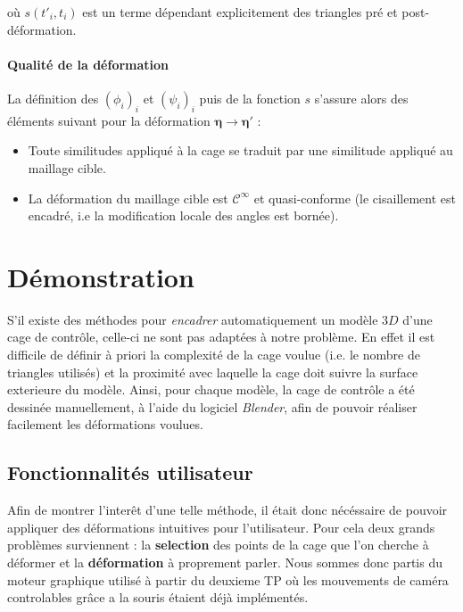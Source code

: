 \documentclass[10pt,a4paper]{article}
\begin{document}
où $s \left(t'_i, t_i \right)$ est un terme dépendant explicitement des triangles pré et post-déformation.

\paragraph{Qualité de la déformation}La définition des $\left( \phi_i \right)_i$ et $\left( \psi_i \right)_i$ puis de la fonction $s$ s'assure alors des éléments suivant pour la déformation $\boldsymbol\eta \rightarrow \boldsymbol\eta'$ :
\begin{itemize}
\item Toute similitudes appliqué à la cage se traduit par une similitude appliqué au maillage cible.
\item La déformation du maillage cible est $\mathcal{C}^\infty$ et quasi-conforme (le cisaillement est encadré, i.e la modification locale des angles est bornée).
\end{itemize}

\section{Démonstration}
S'il existe des méthodes pour \textit{encadrer} automatiquement un modèle $3D$ d'une cage de contrôle, celle-ci ne sont pas adaptées à notre problème. En effet il est difficile de définir à  priori la complexité de la cage voulue (i.e. le nombre de triangles utilisés) et la proximité avec laquelle la cage doit suivre la surface exterieure du modèle. Ainsi, pour chaque modèle, la cage de contrôle a été dessinée manuellement, à l'aide du logiciel \textit{Blender}, afin de pouvoir réaliser facilement les déformations voulues.
 
\subsection{Fonctionnalités utilisateur}
Afin de montrer l'interêt d'une telle méthode, il était donc nécéssaire de pouvoir appliquer des déformations intuitives pour l'utilisateur. Pour cela deux grands problèmes surviennent : la \textbf{selection} des points de la cage que l'on cherche à déformer et la \textbf{déformation} à proprement parler. Nous sommes donc partis du moteur graphique utilisé à partir du deuxieme TP où les mouvements de caméra controlables grâce a la souris étaient déjà implémentés.
\end{document}
